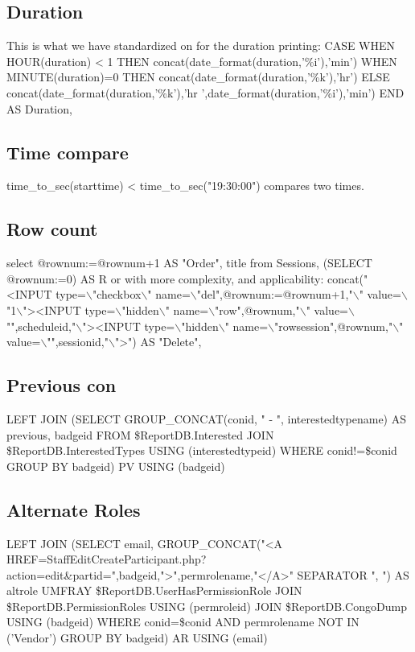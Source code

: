 \documentclass[captions=tablesignature]{scrartcl}
\begin{document}
\subsection{Duration}
\label{sec-2-2}
This is what we have standardized on for the duration printing:
 CASE
   WHEN HOUR(duration) < 1 THEN
     concat(date\_format(duration,'\%i'),'min')
   WHEN MINUTE(duration)=0 THEN
     concat(date\_format(duration,'\%k'),'hr')
   ELSE
     concat(date\_format(duration,'\%k'),'hr ',date\_format(duration,'\%i'),'min')
   END AS Duration,

\subsection{Time compare}
\label{sec-2-3}
time\_to\_sec(starttime) < time\_to\_sec("19:30:00") compares two times.

\subsection{Row count}
\label{sec-2-4}
select @rownum:=@rownum+1 AS "Order", title from Sessions, (SELECT @rownum:=0) AS R
or with more complexity, and applicability:
concat("<INPUT type=$\backslash$"checkbox$\backslash$" name=$\backslash$"del",@rownum:=@rownum+1,"$\backslash$" value=$\backslash$"1$\backslash$">\n<INPUT type=$\backslash$"hidden$\backslash$" name=$\backslash$"row",@rownum,"$\backslash$" value=$\backslash$"",scheduleid,"$\backslash$"><INPUT type=$\backslash$"hidden$\backslash$" name=$\backslash$"rowsession",@rownum,"$\backslash$" value=$\backslash$"",sessionid,"$\backslash$">") AS "Delete",

\subsection{Previous con}
\label{sec-2-5}
LEFT JOIN (SELECT
               GROUP\_CONCAT(conid, " - ", interestedtypename) AS previous,
               badgeid
             FROM
                 \$ReportDB.Interested
               JOIN \$ReportDB.InterestedTypes USING (interestedtypeid)
             WHERE
                conid!=\$conid
              GROUP BY
                 badgeid) PV USING (badgeid)

\subsection{Alternate Roles}
\label{sec-2-6}
LEFT JOIN (SELECT
               email,
               GROUP\_CONCAT("<A HREF=StaffEditCreateParticipant.php?action=edit\&partid=",badgeid,">",permrolename,"</A>" SEPARATOR ", ") AS altrole
             UMFRAY
                 \$ReportDB.UserHasPermissionRole
               JOIN \$ReportDB.PermissionRoles USING (permroleid)
               JOIN \$ReportDB.CongoDump USING (badgeid)
             WHERE
               conid=\$conid AND
               permrolename NOT IN ('Vendor')
             GROUP BY
               badgeid) AR USING (email)
\end{document}
